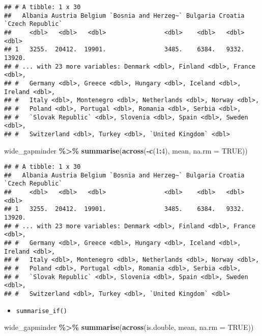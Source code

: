 \documentclass[
]{book}
\newenvironment{Shaded}{\begin{snugshade}}{\end{snugshade}}
\newcommand{\DataTypeTok}[1]{\textcolor[rgb]{0.13,0.29,0.53}{#1}}
\newcommand{\DecValTok}[1]{\textcolor[rgb]{0.00,0.00,0.81}{#1}}
\newcommand{\KeywordTok}[1]{\textcolor[rgb]{0.13,0.29,0.53}{\textbf{#1}}}
\newcommand{\NormalTok}[1]{#1}
\newcommand{\OperatorTok}[1]{\textcolor[rgb]{0.81,0.36,0.00}{\textbf{#1}}}
\newcommand{\OtherTok}[1]{\textcolor[rgb]{0.56,0.35,0.01}{#1}}
\newcommand{\StringTok}[1]{\textcolor[rgb]{0.31,0.60,0.02}{#1}}
\providecommand{\tightlist}{%
  \setlength{\itemsep}{0pt}\setlength{\parskip}{0pt}}
\begin{document}
\begin{verbatim}
## # A tibble: 1 x 30
##   Albania Austria Belgium `Bosnia and Herzeg~` Bulgaria Croatia `Czech Republic`
##     <dbl>   <dbl>   <dbl>                <dbl>    <dbl>   <dbl>            <dbl>
## 1   3255.  20412.  19901.                3485.    6384.   9332.           13920.
## # ... with 23 more variables: Denmark <dbl>, Finland <dbl>, France <dbl>,
## #   Germany <dbl>, Greece <dbl>, Hungary <dbl>, Iceland <dbl>, Ireland <dbl>,
## #   Italy <dbl>, Montenegro <dbl>, Netherlands <dbl>, Norway <dbl>,
## #   Poland <dbl>, Portugal <dbl>, Romania <dbl>, Serbia <dbl>,
## #   `Slovak Republic` <dbl>, Slovenia <dbl>, Spain <dbl>, Sweden <dbl>,
## #   Switzerland <dbl>, Turkey <dbl>, `United Kingdom` <dbl>
\end{verbatim}

\begin{Shaded}
\begin{Highlighting}[]
\NormalTok{wide\_gapminder }\OperatorTok{\%\textgreater{}\%}
\StringTok{  }\KeywordTok{summarise}\NormalTok{(}\KeywordTok{across}\NormalTok{(}\OperatorTok{{-}}\KeywordTok{c}\NormalTok{(}\DecValTok{1}\OperatorTok{:}\DecValTok{4}\NormalTok{), mean, }\DataTypeTok{na.rm =} \OtherTok{TRUE}\NormalTok{))}
\end{Highlighting}
\end{Shaded}

\begin{verbatim}
## # A tibble: 1 x 30
##   Albania Austria Belgium `Bosnia and Herzeg~` Bulgaria Croatia `Czech Republic`
##     <dbl>   <dbl>   <dbl>                <dbl>    <dbl>   <dbl>            <dbl>
## 1   3255.  20412.  19901.                3485.    6384.   9332.           13920.
## # ... with 23 more variables: Denmark <dbl>, Finland <dbl>, France <dbl>,
## #   Germany <dbl>, Greece <dbl>, Hungary <dbl>, Iceland <dbl>, Ireland <dbl>,
## #   Italy <dbl>, Montenegro <dbl>, Netherlands <dbl>, Norway <dbl>,
## #   Poland <dbl>, Portugal <dbl>, Romania <dbl>, Serbia <dbl>,
## #   `Slovak Republic` <dbl>, Slovenia <dbl>, Spain <dbl>, Sweden <dbl>,
## #   Switzerland <dbl>, Turkey <dbl>, `United Kingdom` <dbl>
\end{verbatim}

\begin{itemize}
\tightlist
\item
  \texttt{summarise\_if()}
\end{itemize}

\begin{Shaded}
\begin{Highlighting}[]
\NormalTok{wide\_gapminder }\OperatorTok{\%\textgreater{}\%}
\StringTok{  }\KeywordTok{summarise}\NormalTok{(}\KeywordTok{across}\NormalTok{(is.double, mean, }\DataTypeTok{na.rm =} \OtherTok{TRUE}\NormalTok{))}
\end{Highlighting}
\end{Shaded}
\end{document}
